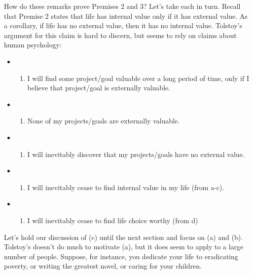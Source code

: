 \documentclass[]{article}
\begin{document}
How do these remarks prove Premises 2 and 3? Let's take each in turn.
Recall that Premise 2 states that life has internal value only if it has
external value. As a corollary, if life has no external value, then it
has no internal value. Tolstoy's argument for this claim is hard to
discern, but seems to rely on claims about human psychology:

\begin{itemize}
\item
  \begin{enumerate}
  \def\labelenumi{(\alph{enumi})}
  \itemsep1pt\parskip0pt
  \item
    I will find some project/goal valuable over a long period of time,
    only if I believe that project/goal is externally valuable.
  \end{enumerate}
\item
  \begin{enumerate}
  \def\labelenumi{(\alph{enumi})}
  \setcounter{enumi}{1}
  \itemsep1pt\parskip0pt
  \item
    None of my projects/goals are externally valuable.
  \end{enumerate}
\item
  \begin{enumerate}
  \def\labelenumi{(\alph{enumi})}
  \setcounter{enumi}{2}
  \itemsep1pt\parskip0pt
  \item
    I will inevitably discover that my projects/goals have no external
    value.
  \end{enumerate}
\item
  \begin{enumerate}
  \def\labelenumi{(\alph{enumi})}
  \setcounter{enumi}{3}
  \itemsep1pt\parskip0pt
  \item
    I will inevitably cease to find internal value in my life (from
    a-c).
  \end{enumerate}
\item
  \begin{enumerate}
  \def\labelenumi{(\alph{enumi})}
  \setcounter{enumi}{4}
  \itemsep1pt\parskip0pt
  \item
    I will inevitably cease to find life choice worthy (from d)
  \end{enumerate}
\end{itemize}

Let's hold our discussion of (c) until the next section and focus on (a)
and (b). Tolstoy's doesn't do much to motivate (a), but it does seem to
apply to a large number of people. Suppose, for instance, you dedicate
your life to eradicating poverty, or writing the greatest novel, or
caring for your children.
\end{document}
